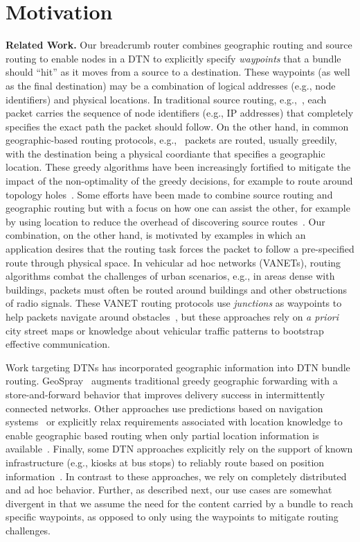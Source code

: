 \section{Motivation}
{\bf Related Work.}
Our {\sc breadcrumb} router combines geographic routing and source routing to enable nodes in a DTN to explicitly specify {\em waypoints} that a bundle should ``hit'' as it moves from a source to a destination. These waypoints (as well as the final destination) may be a combination of logical addresses (e.g., node identifiers) and physical locations. In traditional source routing, e.g.,~\cite{johnson96:dynamic}, each packet carries the sequence of node identifiers (e.g., IP addresses) that completely specifies the exact path the packet should follow. On the other hand, in common geographic-based routing protocols, e.g.,~\cite{florian13:overdrive, karp00:gpsr, navas97:geocast} packets are routed, usually greedily, with the destination being a physical coordiante that specifies a geographic location. These greedy algorithms have been increasingly fortified to mitigate the impact of the non-optimality of the greedy decisions, for example to route around topology holes~\cite{tian03:spatially}. Some efforts have been made to combine source routing and geographic routing but with a focus on how one can assist the other, for example by using location to reduce the overhead of discovering source routes~\cite{basagni99:dynamic}. Our combination, on the other hand, is motivated by examples in which an application desires that the routing task forces the packet to follow a pre-specified route through physical space.  In vehicular ad hoc networks (VANETs), routing algorithms combat the challenges of urban scenarios, e.g., in areas dense with buildings, packets must often be routed around buildings and other obstructions of radio signals. These VANET routing protocols use {\em junctions} as waypoints to help packets navigate around obstacles~\cite{jerbi07:improved, lochert05:geographic}, but these approaches rely on {\em a priori} city street maps or knowledge about vehicular traffic patterns to bootstrap effective communication.

Work targeting DTNs has incorporated geographic information into DTN bundle routing. GeoSpray~\cite{soares14:geospray} augments traditional greedy geographic forwarding with a store-and-forward behavior that improves delivery success in intermittently connected networks. Other approaches use predictions based on navigation systems~\cite{cheng10:geodtn} or explicitly relax requirements associated with location knowledge to enable geographic based routing when only partial location information is available~\cite{kuiper11:geographical}. Finally, some DTN approaches explicitly rely on the support of known infrastructure (e.g., kiosks at bus stops) to reliably route based on position information~\cite{park12:position}. In contrast to these approaches, we rely on completely distributed and ad hoc behavior. Further, as described next, our use cases are somewhat divergent in that we assume the need for the content carried by a bundle to reach specific waypoints, as opposed to only using the waypoints to mitigate routing challenges.